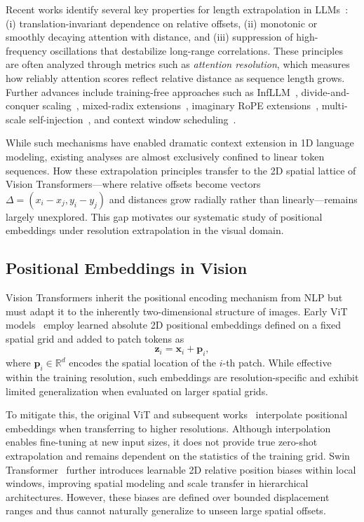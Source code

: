 Recent works identify several key properties for length extrapolation in LLMs~\cite{hong2024token,dong2024exploring}: (i) translation-invariant dependence on relative offsets, (ii) monotonic or smoothly decaying attention with distance, and (iii) suppression of high-frequency oscillations that destabilize long-range correlations. These principles are often analyzed through metrics such as \emph{attention resolution}, which measures how reliably attention scores reflect relative distance as sequence length grows. Further advances include training-free approaches such as InfLLM~\cite{xiao2024infllm}, divide-and-conquer scaling~\cite{yang2025dcis}, mixed-radix extensions~\cite{tian2026mrrope}, imaginary RoPE extensions~\cite{liu2025beyond}, multi-scale self-injection~\cite{han2026stacked}, and context window scheduling~\cite{zhu2025skyladder}.

While such mechanisms have enabled dramatic context extension in 1D language modeling, existing analyses are almost exclusively confined to linear token sequences. How these extrapolation principles transfer to the 2D spatial lattice of Vision Transformers—where relative offsets become vectors $\Delta=(x_i-x_j, y_i-y_j)$ and distances grow radially rather than linearly—remains largely unexplored. This gap motivates our systematic study of positional embeddings under resolution extrapolation in the visual domain.


\subsection{Positional Embeddings in Vision}

Vision Transformers inherit the positional encoding mechanism from NLP but must adapt it to the inherently two-dimensional structure of images. Early ViT models~\cite{dosovitskiy2021image} employ learned absolute 2D positional embeddings defined on a fixed spatial grid and added to patch tokens as
\begin{equation}
\mathbf{z}_i = \mathbf{x}_i + \mathbf{p}_i ,
\end{equation}
where $\mathbf{p}_i \in \mathbb{R}^d$ encodes the spatial location of the $i$-th patch. While effective within the training resolution, such embeddings are resolution-specific and exhibit limited generalization when evaluated on larger spatial grids.

To mitigate this, the original ViT and subsequent works~\cite{beyer2022better} interpolate positional embeddings when transferring to higher resolutions. Although interpolation enables fine-tuning at new input sizes, it does not provide true zero-shot extrapolation and remains dependent on the statistics of the training grid. Swin Transformer~\cite{liu2021swin} further introduces learnable 2D relative position biases within local windows, improving spatial modeling and scale transfer in hierarchical architectures. However, these biases are defined over bounded displacement ranges and thus cannot naturally generalize to unseen large spatial offsets.

